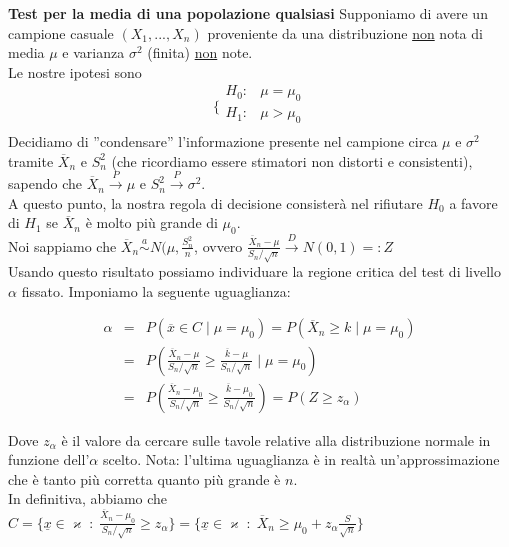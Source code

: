 \textbf{Test per la media di una popolazione qualsiasi} Supponiamo di avere un campione casuale $(X_1,...,X_n)$ proveniente da una distribuzione \underline{non} nota di media $\mu$ e varianza $\sigma^2$ (finita) \underline{non} note.\\
Le nostre ipotesi sono 
$$\bigg \{
\begin{array}{rl}
H_0: & \mu=\mu_0 \\
H_1: & \mu>\mu_0 \\
\end{array}
$$
Decidiamo di ''condensare'' l'informazione presente nel campione circa $\mu$ e $\sigma^2$ tramite $\overline{X}_n$ e $S_n^2$ (che ricordiamo essere stimatori non distorti e consistenti), sapendo che $\overline{X}_n \stackrel{P}{\rightarrow} \mu$ e $S_n^2 \stackrel{P}{\rightarrow} \sigma^2$.\\
A questo punto, la nostra regola di decisione consisterà nel rifiutare $H_0$ a favore di $H_1$ se $\overline{X}_n$ è molto più grande di $\mu_0$.\\
Noi sappiamo che $\overline{X}_n \stackrel{a}{\sim} N(\mu, \frac{S_n^2}{n}$, ovvero $\frac{\overline{X}_n-\mu}{S_n/\sqrt{n}} \stackrel{D}{\rightarrow} N(0,1) =: Z$\\
Usando questo risultato possiamo individuare la regione critica del test di livello $\alpha$ fissato. Imponiamo la seguente uguaglianza:

\begin{eqnarray}
\alpha 	&=& P(\overline{x} \in C \mid \mu=\mu_0) = P(\overline{X}_n \geq k \mid \mu=\mu_0) \nonumber \\
		&=& P \left( \frac{\overline{X}_n-\mu}{S_n/\sqrt{n}} \geq \frac{\overline{k}-\mu}{S_n/\sqrt{n}} \mid \mu=\mu_0 \right) \nonumber \\
		&=& P \left( \frac{\overline{X}_n-\mu_0}{S_n/\sqrt{n}} \geq \frac{\overline{k}-\mu_0}{S_n/\sqrt{n}} \right) = P(Z \geq z_{\alpha}) \nonumber
\end{eqnarray}

Dove $z_{\alpha}$ è il valore da cercare sulle tavole relative alla distribuzione normale in funzione dell'$\alpha$ scelto. Nota: l'ultima uguaglianza è in realtà un'approssimazione che è tanto più corretta quanto più grande è $n$.\\
In definitiva, abbiamo che $C = \lbrace \underline{x} \in \varkappa \; : \; \frac{\overline{X}_n-\mu_0}{S_n/\sqrt{n}} \geq z_{\alpha} \rbrace = \lbrace \underline{x} \in \varkappa \; : \; \overline{X}_n \geq \mu_0 + z_{\alpha} \frac{S}{\sqrt{n}} \rbrace$\\


